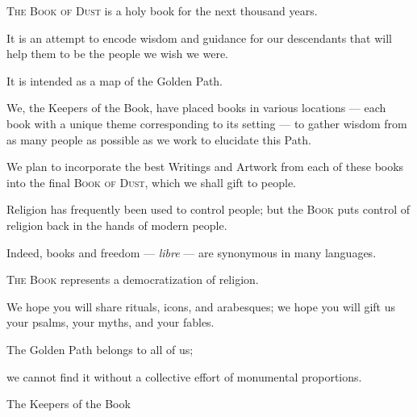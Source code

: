\begin{multicols}{2}
\bverse \textsc{The Book of Dust} is a holy book for the next thousand years.

\bverse It is an attempt to encode wisdom and guidance for our descendants that will help them to be the people we wish we were.

\bverse It is intended as a map of the Golden Path.

\bverse We, the Keepers of the Book, have placed books in various locations --- each book with a unique theme corresponding to its setting --- to gather wisdom from as many people as possible as we work to elucidate this Path.

\bverse We plan to incorporate the best Writings and Artwork from each of these books into the final \textsc{Book of Dust}, which we shall gift to people.

\bverse Religion has frequently been used to control people; but the \textsc{Book} puts control of religion back in the hands of modern people.

\bverse Indeed, books and freedom --- \textit{libre} --- are synonymous in many languages.

\bverse\textsc{The Book} represents a democratization of religion.

\bverse We hope you will share rituals, icons, and arabesques; we hope you will gift us your psalms, your myths, and your fables.

\bverse The Golden Path belongs to all of us;

\bverse we cannot find it without a collective effort of monumental proportions.
\bigskip
\begin{flushright}
The Keepers of the Book
\end{flushright}
\end{multicols}